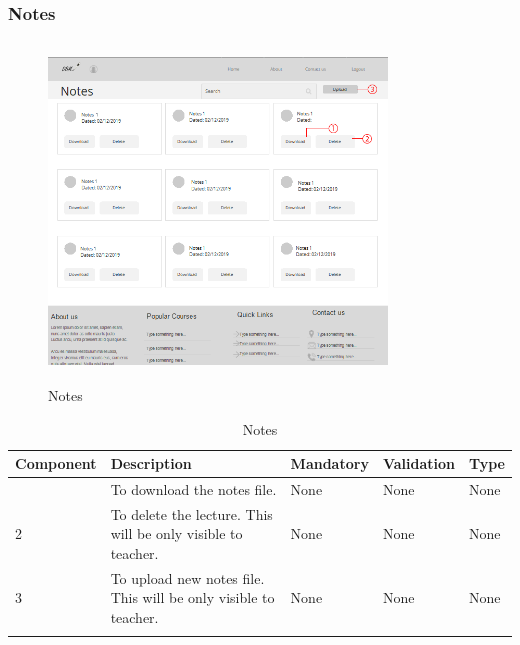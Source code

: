 \documentclass[12pt]{article}
\begin{document}



%
%
%
\subsubsection{Notes}
\begin{figure}[h]
  \centering
  \includegraphics[width=9cm, height=9cm]{NotesPage(Teacher)}
  \caption{Notes}
\end{figure}

\newpage
\begin{longtable}{|>{\raggedright\arraybackslash}p{2.5cm}|>{\raggedright\arraybackslash}p{4cm}|>{\raggedright\arraybackslash}p{2.2cm}|>{\raggedright\arraybackslash}p{2cm}|>{\raggedright\arraybackslash}p{2cm}|}
\hline
\textbf{Component} & \textbf{Description} & \textbf{Mandatory} & \textbf{Validation} & \textbf{Type}\\
\hline
1 &
To download the notes file. &
None &
None &
None\\
\hline

2 &
To delete the lecture. This will be only visible to teacher. &
None &
None &
None \\
\hline

3 &
To upload new notes file. This will be only visible to teacher. &
None &
None &
None \\
\hline

\caption{Notes}
\end{longtable}
\end{document}
